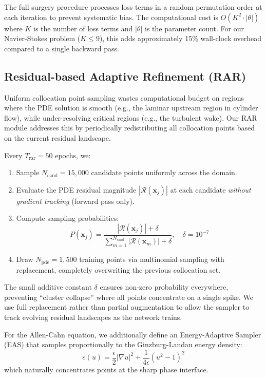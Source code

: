 \documentclass[conference]{IEEEtran}
\begin{document}
The full surgery procedure processes loss terms in a random permutation order at each iteration to prevent systematic bias. The computational cost is $O(K^2 \cdot |\theta|)$ where $K$ is the number of loss terms and $|\theta|$ is the parameter count. For our Navier-Stokes problem ($K \leq 9$), this adds approximately 15\% wall-clock overhead compared to a single backward pass.

\subsection{Residual-based Adaptive Refinement (RAR)}
\label{sec:rar}

Uniform collocation point sampling wastes computational budget on regions where the PDE solution is smooth (e.g., the laminar upstream region in cylinder flow), while under-resolving critical regions (e.g., the turbulent wake). Our RAR module addresses this by periodically redistributing all collocation points based on the current residual landscape.

Every $T_{\text{rar}} = 50$ epochs, we:
\begin{enumerate}
    \item Sample $N_{\text{cand}} = 15{,}000$ candidate points uniformly across the domain.
    \item Evaluate the PDE residual magnitude $|\mathcal{R}(\bm{x}_j)|$ at each candidate \emph{without gradient tracking} (forward pass only).
    \item Compute sampling probabilities:
    \begin{equation}
        P(\bm{x}_j) = \frac{|\mathcal{R}(\bm{x}_j)| + \delta}{\sum_{m=1}^{N_{\text{cand}}} |\mathcal{R}(\bm{x}_m)| + \delta}, \quad \delta = 10^{-7}
        \label{eq:rar}
    \end{equation}
    \item Draw $N_{\text{pde}} = 1{,}500$ training points via multinomial sampling with replacement, completely overwriting the previous collocation set.
\end{enumerate}

The small additive constant $\delta$ ensures non-zero probability everywhere, preventing ``cluster collapse'' where all points concentrate on a single spike. We use full replacement rather than partial augmentation to allow the sampler to track evolving residual landscapes as the network trains.

For the Allen-Cahn equation, we additionally define an Energy-Adaptive Sampler (EAS) that samples proportionally to the Ginzburg-Landau energy density:
\begin{equation}
    e(u) = \frac{\epsilon}{2}|\nabla u|^2 + \frac{1}{4\epsilon}(u^2 - 1)^2
    \label{eq:energy}
\end{equation}
which naturally concentrates points at the sharp phase interface.
\end{document}
